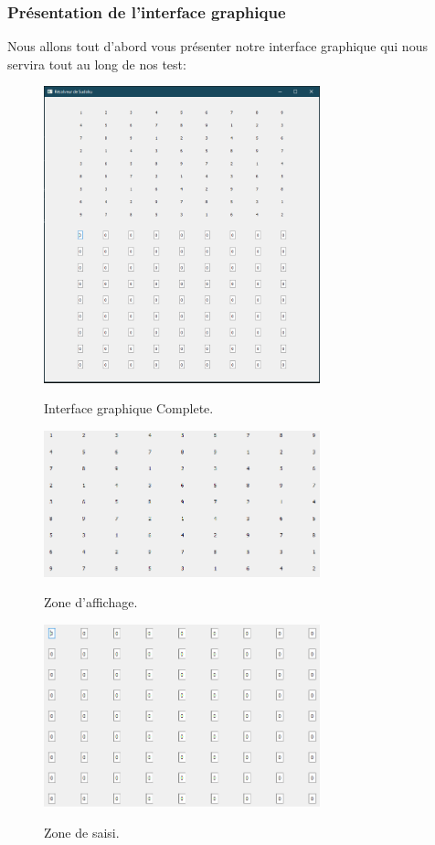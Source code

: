 \subsubsection{Présentation de l'interface graphique}
Nous allons tout d'abord vous présenter notre interface graphique qui nous servira tout au long de nos test:\newline

\begin{figure}[h]
  \begin{center}
\includegraphics[width=8cm]{./images/Interface_Complete.png}\label{Interface_complete}
\caption{Interface graphique Complete.}
\end{center}
\end{figure}


\begin{figure}[h]
  \begin{center}
\includegraphics[width=8cm]{./images/Interface_Affichage.png}\label{Interface_affichage}
\caption{Zone d'affichage.}
\end{center}
\end{figure}


\begin{figure}[h]
  \begin{center}
\includegraphics[width=8cm]{./images/Interface_saisi.png}\label{Interface_saisi}
\caption{Zone de saisi.}
\end{center}
\end{figure}

